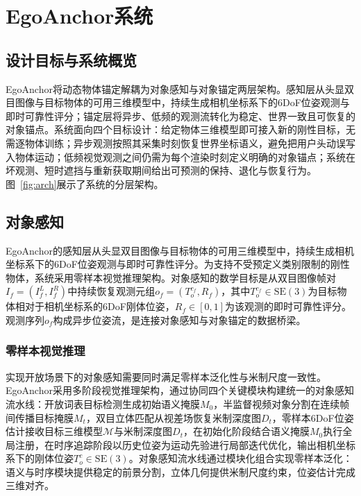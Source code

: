 \documentclass[review]{vgtc}
\begin{document}
\section{EgoAnchor系统}\label{sec:system}

\subsection{设计目标与系统概览}

EgoAnchor将动态物体锚定解耦为对象感知与对象锚定两层架构。感知层从头显双目图像与目标物体的可用三维模型中，持续生成相机坐标系下的6DoF位姿观测与即时可靠性评分；锚定层将异步、低频的观测流转化为稳定、世界一致且可恢复的对象锚点。系统面向四个目标设计：给定物体三维模型即可接入新的刚性目标，无需逐物体训练；异步观测按照其采集时刻恢复世界坐标语义，避免把用户头动误写入物体运动；低频视觉观测之间仍需为每个渲染时刻定义明确的对象锚点；系统在坏观测、短时遮挡与重新获取期间给出可预测的保持、退化与恢复行为。图~\ref{fig:arch}展示了系统的分层架构。


\subsection{对象感知}\label{sec:perception}

EgoAnchor的感知层从头显双目图像与目标物体的可用三维模型中，持续生成相机坐标系下的6DoF位姿观测与即时可靠性评分。为支持不受预定义类别限制的刚性物体，系统采用零样本视觉推理架构。对象感知的数学目标是从双目图像帧对$I_f = (I_f^L, I_f^R)$中持续恢复观测元组$o_f = (T_o^{c_f}, R_f)$，其中$T_o^{c_f} \in \mathrm{SE}(3)$为目标物体相对于相机坐标系的6DoF刚体位姿，$R_f \in [0,1]$为该观测的即时可靠性评分。观测序列${o_f}$构成异步位姿流，是连接对象感知与对象锚定的数据桥梁。

\subsubsection{零样本视觉推理}

实现开放场景下的对象感知需要同时满足零样本泛化性与米制尺度一致性。EgoAnchor采用多阶段视觉推理架构，通过协同四个关键模块构建统一的对象感知流水线：开放词表目标检测生成初始语义掩膜$M_0$，半监督视频对象分割在连续帧间传播目标掩膜$M_t$，双目立体匹配从视差场恢复米制深度图$D_t$，零样本6DoF位姿估计接收目标三维模型$\mathcal{M}$与米制深度图$D_t$，在初始化阶段结合语义掩膜$M_0$执行全局注册，在时序追踪阶段以历史位姿为运动先验进行局部迭代优化，输出相机坐标系下的刚体位姿$T_o^c \in \mathrm{SE}(3)$。对象感知流水线通过模块化组合实现零样本泛化：语义与时序模块提供稳定的前景分割，立体几何提供米制尺度约束，位姿估计完成三维对齐。
\end{document}
